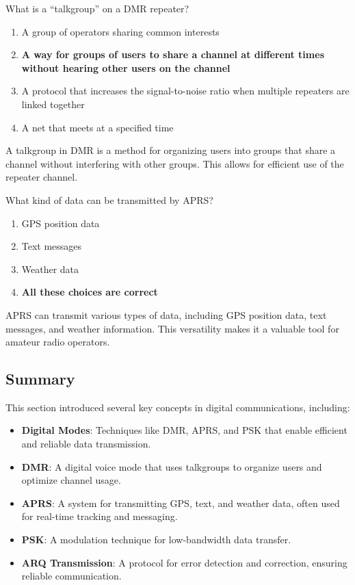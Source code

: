 
\begin{tcolorbox}[colback=gray!10!white,colframe=black!75!black,title={T8D02}]
    What is a “talkgroup” on a DMR repeater?
    \begin{enumerate}[label=\Alph*),noitemsep]
        \item A group of operators sharing common interests
        \item \textbf{A way for groups of users to share a channel at different times without hearing other users on the channel}
        \item A protocol that increases the signal-to-noise ratio when multiple repeaters are linked together
        \item A net that meets at a specified time
    \end{enumerate}
\end{tcolorbox}
A talkgroup in DMR is a method for organizing users into groups that share a channel without interfering with other groups. This allows for efficient use of the repeater channel.


\begin{tcolorbox}[colback=gray!10!white,colframe=black!75!black,title={T8D03}]
    What kind of data can be transmitted by APRS?
    \begin{enumerate}[label=\Alph*),noitemsep]
        \item GPS position data
        \item Text messages
        \item Weather data
        \item \textbf{All these choices are correct}
    \end{enumerate}
\end{tcolorbox}
APRS can transmit various types of data, including GPS position data, text messages, and weather information. This versatility makes it a valuable tool for amateur radio operators.


\subsection*{Summary}
This section introduced several key concepts in digital communications, including:
\begin{itemize}
    \item \textbf{Digital Modes}: Techniques like DMR, APRS, and PSK that enable efficient and reliable data transmission.
    \item \textbf{DMR}: A digital voice mode that uses talkgroups to organize users and optimize channel usage.
    \item \textbf{APRS}: A system for transmitting GPS, text, and weather data, often used for real-time tracking and messaging.
    \item \textbf{PSK}: A modulation technique for low-bandwidth data transfer.
    \item \textbf{ARQ Transmission}: A protocol for error detection and correction, ensuring reliable communication.
\end{itemize}
